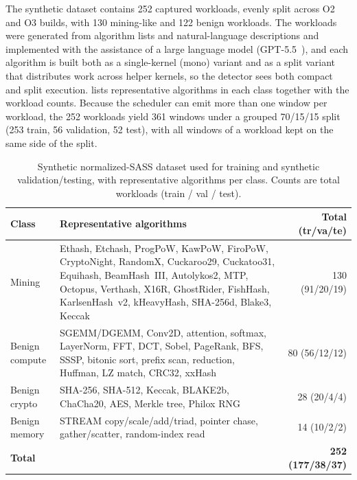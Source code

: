 The synthetic dataset contains 252 captured workloads, evenly split across O2 and O3 builds, with 130 mining-like and 122 benign workloads. The workloads were generated from algorithm lists and natural-language descriptions and implemented with the assistance of a large language model (GPT-5.5~\cite{openai_gpt55}), and each algorithm is built both as a single-kernel (mono) variant and as a split variant that distributes work across helper kernels, so the detector sees both compact and split execution.  lists representative algorithms in each class together with the workload counts. Because the scheduler can emit more than one window per workload, the 252 workloads yield 361 windows under a grouped 70/15/15 split (253 train, 56 validation, 52 test), with all windows of a workload kept on the same side of the split.

\begin{table}[t]
    \centering
    \caption{Synthetic normalized-SASS dataset used for training and synthetic validation/testing, with representative algorithms per class. Counts are total workloads (train / val / test).}
    \label{tab:synthetic_dataset}
    \footnotesize
    \begin{tabular}{@{}l p{4.4cm} r@{}}
        \toprule
        Class & Representative algorithms & Total (tr/va/te) \\
        \midrule
        Mining & Ethash, Etchash, ProgPoW, KawPoW, FiroPoW, CryptoNight, RandomX, Cuckaroo29, Cuckatoo31, Equihash, BeamHash~III, Autolykos2, MTP, Octopus, Verthash, X16R, GhostRider, FishHash, KarlsenHash~v2, kHeavyHash, SHA-256d, Blake3, Keccak & 130 (91/20/19) \\
        \midrule
        Benign compute & SGEMM/DGEMM, Conv2D, attention, softmax, LayerNorm, FFT, DCT, Sobel, PageRank, BFS, SSSP, bitonic sort, prefix scan, reduction, Huffman, LZ match, CRC32, xxHash & 80 (56/12/12) \\
        \midrule
        Benign crypto & SHA-256, SHA-512, Keccak, BLAKE2b, ChaCha20, AES, Merkle tree, Philox RNG & 28 (20/4/4) \\
        \midrule
        Benign memory & STREAM copy/scale/add/triad, pointer chase, gather/scatter, random-index read & 14 (10/2/2) \\
        \midrule
        \textbf{Total} & & \textbf{252 (177/38/37)} \\
        \bottomrule
    \end{tabular}
\end{table}

